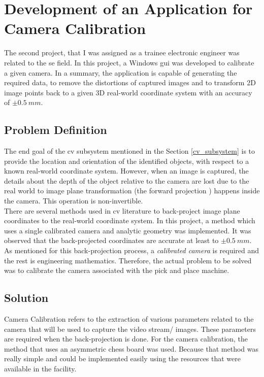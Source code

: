 \documentclass[a4paper,12pt]{report}%
\begin{document}
\pagebreak
\section{Development of an Application for Camera Calibration}

The second project, that I was assigned as a trainee electronic engineer was related to the \ac{se} field. In this project, a Windows \ac{gui} was developed to calibrate a given camera. In a summary, the application is capable of generating the required data, to remove the distortions of captured images and to transform 2D image points back to a given 3D real-world coordinate system with an accuracy of $\pm 0.5 ~mm$.

\subsection{Problem Definition}
The end goal of the \ac{cv} subsystem mentioned in the Section \ref{cv_subsystem} is to provide the location and orientation of the identified objects, with respect to a known real-world coordinate system. However, when an image is captured, the details about the depth of the object relative to the camera are lost due to the real world to image plane transformation (the forward projection \cite{hartley_zisserman_2004}) happens inside the camera. This operation is non-invertible.\\

There are several methods used in \ac{cv}  literature to back-project image plane coordinates to the real-world coordinate system. In this project, a method which uses a single calibrated camera and analytic geometry was implemented. It was observed that the back-projected coordinates are accurate at least to $\pm 0.5 ~mm$. As mentioned for this back-projection process, a \textit{calibrated camera} is required and the rest is engineering mathematics. Therefore, the actual problem to be solved was to calibrate the camera associated with the pick and place machine.



\subsection{Solution}
Camera Calibration refers to the extraction of various parameters related to the camera that will be used to capture the video stream/ images. These parameters are required when the back-projection is done. For the camera calibration, the method that uses an asymmetric chess board was used\cite{cam_calib:_nodate}. Because that method was really simple and could be implemented easily using the resources that were available in the facility.\\
\end{document}
